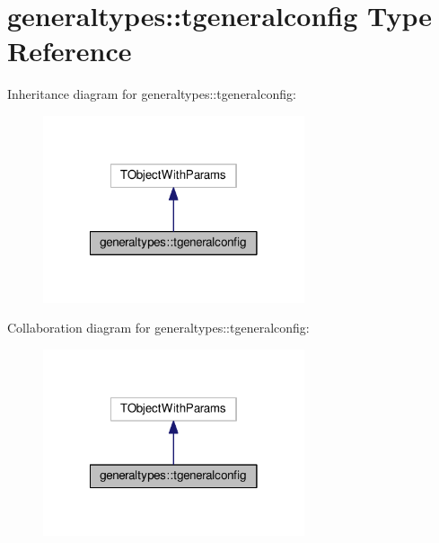 \hypertarget{structgeneraltypes_1_1tgeneralconfig}{}\section{generaltypes\+:\+:tgeneralconfig Type Reference}
\label{structgeneraltypes_1_1tgeneralconfig}


Inheritance diagram for generaltypes\+:\+:tgeneralconfig\+:
\nopagebreak
\begin{figure}[H]
\begin{center}
\leavevmode
\includegraphics[width=218pt]{structgeneraltypes_1_1tgeneralconfig__inherit__graph}
\end{center}
\end{figure}


Collaboration diagram for generaltypes\+:\+:tgeneralconfig\+:
\nopagebreak
\begin{figure}[H]
\begin{center}
\leavevmode
\includegraphics[width=218pt]{structgeneraltypes_1_1tgeneralconfig__coll__graph}
\end{center}
\end{figure}
